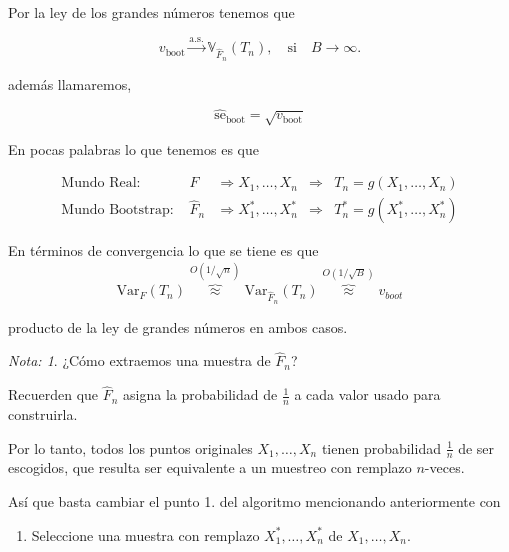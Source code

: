 \documentclass[
  12pt,
]{book}
\providecommand{\tightlist}{%
  \setlength{\itemsep}{0pt}\setlength{\parskip}{0pt}}
\theoremstyle{definition}
\theoremstyle{definition}
\theoremstyle{definition}
\theoremstyle{definition}
\theoremstyle{remark}
\newtheorem*{remark}{Nota: }
\begin{document}
Por la ley de los grandes números tenemos que

\begin{equation}
v_{\mathrm{boot}} \stackrel{\mathrm{a.s.}}{\longrightarrow} \mathbb{V}_{\widehat{F}_{n}}\left(T_{n}\right), \quad  \text{si} \quad B\rightarrow \infty.
\end{equation}

además llamaremos,

\begin{equation*}
\widehat{\mathrm{se}}_{\mathrm{boot}}=\sqrt{v_{\mathrm{boot}}}
\end{equation*}

En pocas palabras lo que tenemos es que

\begin{align*}
\text  {Mundo Real: }
& F
& \Longrightarrow  X_{1}, \ldots, X_{n}
& \Longrightarrow
& T_{n} = g\left(X_{1}, \ldots, X_{n}\right) \\
\text {Mundo Bootstrap: }
& \widehat{F}_{n}
& \Longrightarrow  X_{1}^{*}, \ldots, X_{n}^{*}
& \Longrightarrow
& T_{n}^{*}=g\left(X_{1}^{*}, \ldots, X_{n}^{*}\right)
\end{align*}

En términos de convergencia lo que se tiene es que
\[
\mathrm{Var}_{F}\left(T_{n}\right) \overbrace{\approx}^{O(1 / \sqrt{n})} \mathrm{Var}_{\widehat{F}_{n}}\left(T_{n}\right) \overbrace{\approx}^{O(1 / \sqrt{B})} v_{b o o t}
\]

producto de la ley de grandes números en ambos casos.

\begin{remark}
¿Cómo extraemos una muestra de \(\hat{F}_n\)?
\end{remark}

Recuerden que \(\hat{F}_{n}\) asigna la probabilidad de \(\frac{1}{n}\) a cada valor usado para construirla.

Por lo tanto, todos los puntos originales \(X_{1},\ldots,X_{n}\) tienen probabilidad \(\frac{1}{n}\) de ser escogidos, que resulta ser equivalente a un muestreo con remplazo \(n\)-veces.

Así que basta cambiar el punto 1. del algoritmo mencionando anteriormente con

\begin{enumerate}
\def\labelenumi{\arabic{enumi}.}
\tightlist
\item
  Seleccione una muestra con remplazo \(X_{1}^{*}, \ldots, X_{n}^{*}\) de \(X_{1},\ldots,X_{n}\).
\end{enumerate}
\end{document}
